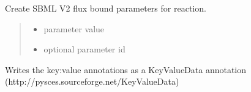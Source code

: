 \documentclass[letterpaper,12pt,english]{sphinxmanual}
\begin{document}
\begin{fulllineitems}
\begin{fulllineitems}
\begin{quote}
\begin{description}
\end{description}\end{quote}

\end{fulllineitems}


\begin{fulllineitems}
\label{\detokenize{api/io:cbmpy.CBXML.CBMtoSBML3.createFbParameterSharedV2}}
\pysigstartsignatures
\pysiglinewithargsret
{}
{\sphinxparamcomma {}}
{}
\pysigstopsignatures
\sphinxAtStartPar
Create SBML V2 flux bound parameters for reaction.
\begin{quote}\begin{description}
\begin{itemize}
\item {} 
\sphinxAtStartPar
{} \textendash{} parameter value

\item {} 
\sphinxAtStartPar
{} \textendash{} optional parameter id

\end{itemize}

\end{description}\end{quote}

\end{fulllineitems}


\end{fulllineitems}


\begin{fulllineitems}
\label{\detokenize{api/io:cbmpy.CBXML.sbml_writeKeyValueDataAnnotation}}
\pysigstartsignatures
\pysiglinewithargsret
{}
{}
{}
\pysigstopsignatures
\sphinxAtStartPar
Writes the key:value annotations as a KeyValueData annotation (http://pysces.sourceforge.net/KeyValueData)

\end{fulllineitems}
\end{document}
